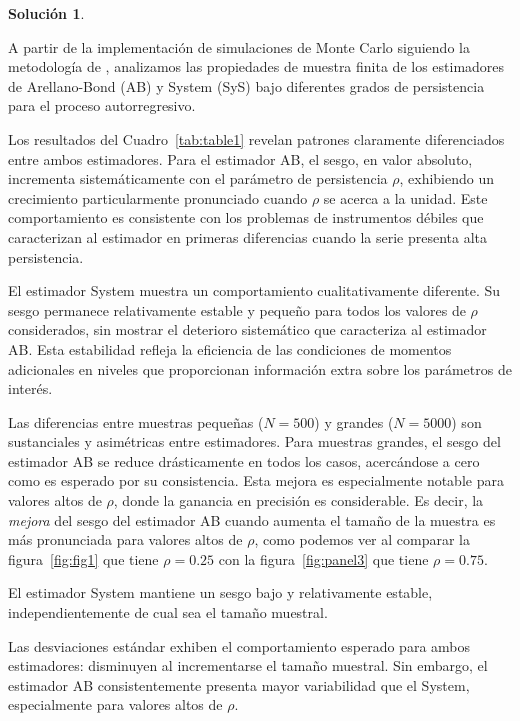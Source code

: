 \documentclass[12pt,letterpaper,reqno,oneside]{amsart}
\theoremstyle{problemstyle} %
\theoremstyle{definition} %
\newtheorem{solution}{Solución}[problem]
\begin{document}
\begin{solution} %
  \label{sol:3}

  A partir de la implementación de simulaciones de Monte Carlo siguiendo la metodología de \textcite{al-sadoonSimpleMethodsConsistent2019}, analizamos las propiedades de muestra finita de los estimadores de Arellano-Bond (AB) y System (SyS) bajo diferentes grados de persistencia para el proceso autorregresivo.

  Los resultados del Cuadro~\ref{tab:table1} revelan patrones claramente diferenciados entre ambos estimadores.
  Para el estimador AB, el sesgo, en valor absoluto, incrementa sistemáticamente con el parámetro de persistencia $\rho$, exhibiendo un crecimiento particularmente pronunciado cuando $\rho$ se acerca a la unidad.
  Este comportamiento es consistente con los problemas de instrumentos débiles que caracterizan al estimador en primeras diferencias cuando la serie presenta alta persistencia.

  El estimador System muestra un comportamiento cualitativamente diferente.
  Su sesgo permanece relativamente estable y pequeño para todos los valores de $\rho$ considerados, sin mostrar el deterioro sistemático que caracteriza al estimador AB.
  Esta estabilidad refleja la eficiencia de las condiciones de momentos adicionales en niveles que proporcionan información extra sobre los parámetros de interés.

  Las diferencias entre muestras pequeñas ($N = 500$) y grandes ($N = 5000$) son sustanciales y asimétricas entre estimadores.
  Para muestras grandes, el sesgo del estimador AB se reduce drásticamente en todos los casos, acercándose a cero como es esperado por su consistencia.
  Esta mejora es especialmente notable para valores altos de $\rho$, donde la ganancia en precisión es considerable.
  Es decir, la \emph{mejora} del sesgo del estimador AB cuando aumenta el tamaño de la muestra es más pronunciada para valores altos de $\rho$, como podemos ver al comparar la figura~\ref{fig:fig1} que tiene $\rho = 0.25$ con la figura~\ref{fig:panel3} que tiene $\rho = 0.75$.

  El estimador System mantiene un sesgo bajo y relativamente estable, independientemente de cual sea el tamaño muestral.

  Las desviaciones estándar exhiben el comportamiento esperado para ambos estimadores: disminuyen al incrementarse el tamaño muestral.
  Sin embargo, el estimador AB consistentemente presenta mayor variabilidad que el System, especialmente para valores altos de $\rho$.


\end{solution}
\end{document}
